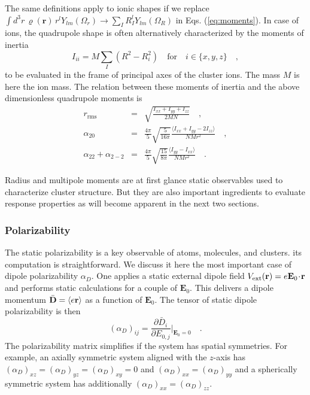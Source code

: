 \documentclass[final,1p]{elsarticle}
\begin{document}
The same definitions apply to ionic shapes if we replace $\int
d^3r\,\varrho(\mathbf{r})\,r^lY_{lm}(\Omega_r)
\longrightarrow\sum_IR_I^lY_{lm}(\Omega_R)$ in
Eqs. (\ref{eq:moments}).
In case of ions, 
the quadrupole shape is often alternatively characterized by the
moments of inertia
\begin{equation}
  I_{ii}=M\sum_I\left(R^2_{\mbox{}}-R_i^2\right)
  \quad\mbox{for}\quad
  i\in\{x,y,z\}
  \quad,
\end{equation}
to be evaluated in the frame of principal axes of the cluster ions.  The
mass $M$ is here the ion mass.
The relation between these moments of inertia and the 
above dimensionless quadrupole moments is
\begin{subequations}
\begin{eqnarray}
  r_\mathrm{rms}
  &=&
  \sqrt{\frac{I_{xx}+I_{yy}+I_{zz}}{2MN}}
  \quad,
\\
  \alpha_{20}
  &=&
  \frac{4\pi}{5}\sqrt{\frac{5}{16\pi}}
  \frac{\langle I_{xx}+I_{yy}-2I_{zz}\rangle}{NMr^2}
  \quad,
\\
  \alpha_{22}+\alpha_{2-2}
  &=&
  \frac{4\pi}{5}\sqrt{\frac{15}{8\pi}}
  \frac{\langle I_{yy}-I_{xx}\rangle}{NMr^2}
  \quad.
\end{eqnarray}
\end{subequations}

Radius and multipole moments are at first glance static observables
used to characterize cluster structure. But they are also important
ingredients to evaluate response properties as will become apparent in
the next two sections.


\subsubsection{Polarizability}
\label{sec:comppol}

The static polarizability is a key observable of atoms, molecules, and
clusters.  its computation is straightforward.  We discuss it here the
most important case of dipole polarizability $\alpha_D$.  One applies
a static external dipole field
$V_\mathrm{ext}(\mathbf{r})=e\mathbf{E}_0\!\cdot\!{\bf r}$ and
performs static calculations for a couple of $\mathbf{E}_0$.  This
delivers a dipole momentum $\bar{\bf D}=\langle e\mathbf{r}\rangle$ as
a function of $\mathbf{E}_0$. The tensor of static dipole
polarizability is then
\begin{equation}
  (\alpha_D)_{ij}
  =
  \frac{\partial\bar{D}_i}{\partial{E}_{0,j}}\Big|_{\mathbf{E}_0=0}
  \quad.
\label{eq:comppolar}
\end{equation}
The polarizability matrix simplifies if the system has spatial
symmetries. For example, an axially symmetric system aligned with the $z$-axis
has $(\alpha_D)_{xz}=(\alpha_D)_{yz}=(\alpha_D)_{xy}=0$ and
$(\alpha_D)_{xx}=(\alpha_D)_{yy}$ and a spherically symmetric system
has additionally $(\alpha_D)_{xx}=(\alpha_D)_{zz}$.
\end{document}
